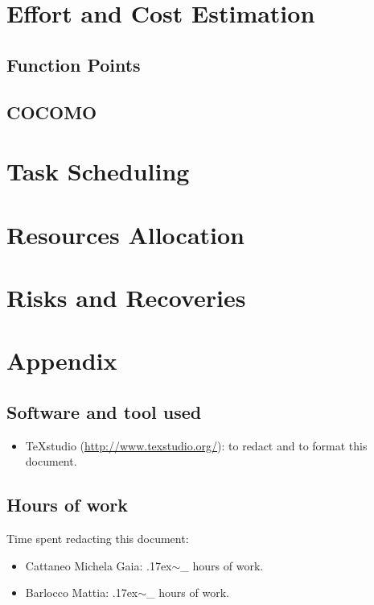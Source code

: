 \documentclass[18pt,oneside,a4paper, titlepage]{article}
\begin{document}
\newpage
\section{Effort and Cost Estimation}

	\subsection{Function Points}
	\subsection{COCOMO}
	
\newpage
\section{Task Scheduling}
	
\newpage
\section{Resources Allocation}

\newpage
\section{Risks and Recoveries}

\newpage
\section{Appendix}

	\subsection{Software and tool used}
		\begin{itemize}
			\item TeXstudio (\url{http://www.texstudio.org/}): to redact and to format this document.
		\end{itemize}
	
	\subsection{Hours of work}
		Time spent redacting this document:
		\begin{itemize}
			\item Cattaneo Michela Gaia: {\raise.17ex\hbox{$\scriptstyle\sim$}}\_ hours of work.
			\item Barlocco Mattia: {\raise.17ex\hbox{$\scriptstyle\sim$}}\_ hours of work.
		\end{itemize}
\end{document}

